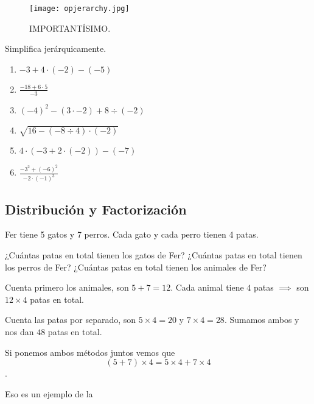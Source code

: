 \begin{figure}
    \centering
    \texttt{[image: opjerarchy.jpg]}
    \caption{IMPORTANTÍSIMO.}
\end{figure}

\begin{exercise}
    Simplifica jerárquicamente.
    \begin{enumerate}
        \item $-3 + 4 \cdot (-2) - (-5)$
        \item $\frac{-18 + 6 \cdot 5}{-3}$
        \item $(-4)^2 - (3 \cdot -2) + 8 \div (-2)$
        \item $\sqrt{16 - (-8 \div 4) \cdot (-2)}$
        \item $4 \cdot \left(-3 + 2 \cdot (-2)\right) - (-7)$
        \item $\frac{-3^2 + (-6)^2}{-2 \cdot (-1)^3}$
    \end{enumerate}
\end{exercise}

\subsection{Distribución y Factorización}

\begin{example}
    Fer tiene 5 gatos y 7 perros. Cada gato y cada perro tienen 
    4 patas.

    \begin{enumerate}
        \ii ¿Cuántas patas en total tienen los gatos de Fer?
        \ii ¿Cuántas patas en total tienen los perros de Fer?
        \ii ¿Cuántas patas en total tienen los animales de Fer?
    \end{enumerate}
\end{example}

\begin{soln}
    Cuenta primero los animales, son $5+7 = 12$. Cada animal 
    tiene $4$ patas $\implies$ son $12\times 4$ patas en total.
\end{soln}

\begin{soln}
    Cuenta las patas por separado, son $5\times 4 = 20$ y $7\times 4 = 28$. 
    Sumamos ambos y nos dan $48$ patas en total.
\end{soln}

Si ponemos ambos métodos juntos vemos que 
\[(5+7) \times 4 = 5\times 4 + 7 \times 4\].

Eso es un ejemplo de la

